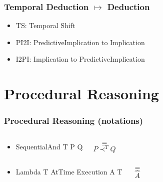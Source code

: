 \documentclass[aspectratio=169]{beamer}
\begin{document}
\begin{frame}
  \frametitle{Temporal Deduction $\mapsto$ Deduction}
  {\small
    \begin{prooftree}
    \end{prooftree}}

  \begin{itemize}
  \item TS: Temporal Shift
  \item PI2I: PredictiveImplication to Implication
  \item I2PI: Implication to PredictiveImplication
  \end{itemize}
\end{frame}

\section{Procedural Reasoning}

\begin{frame}[fragile]
  \frametitle{Procedural Reasoning (notations)}
  \begin{itemize}
  \item<+->
  \begin{columns}
    \column{1in}
\begin{semiverbatim}
SequentialAnd
  T
  P
  Q
\end{semiverbatim}
    \column{0.5in}
    $$\equiv$$
    \column{1in}
    $$P \prec^T Q$$
  \end{columns}

  \item<+->
  \begin{columns}
    \column{1in}
\begin{semiverbatim}
Lambda
  T
  AtTime
    Execution
      A
    T
\end{semiverbatim}
    \column{0.5in}
    $$\equiv$$
    \column{1in}
    $$\widehat{A}$$
  \end{columns}
  \end{itemize}
\end{frame}
\end{document}

